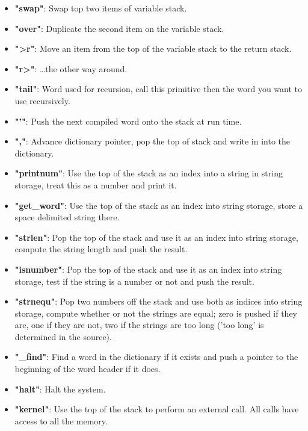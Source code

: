 \documentclass	[a4paper, 10pt]	{article}
\begin{document}
\begin{itemize}
        \item \textbf{"swap"}: Swap top two items of variable stack.
        \item \textbf{"over"}: Duplicate the second item on the variable stack. 
        \item \textbf{">r"}: Move an item from the top of the variable
        stack to the return stack.
        \item \textbf{"r>"}: \ldots the other way around.
        \item \textbf{"tail"}: Word used for recursion, call this primitive
        then the word you want to use recursively.
        \item \textbf{"'"}: Push the next compiled word onto the stack at
        run time.
        \item \textbf{","}: Advance dictionary pointer, pop the top of stack
        and write in into the dictionary.
        \item \textbf{"printnum"}: Use the top of the stack as an index into
        a string in string storage, treat this as a number and print it.
        \item \textbf{"get\_word"}: Use the top of the stack as an index into
        string storage, store a space delimited string there.
        \item \textbf{"strlen"}: Pop the top of the stack and use it as an index
        into string storage, compute the string length and push the result.
        \item \textbf{"isnumber"}: Pop the top of the stack and use it as an index
        into string storage, test if the string is a number or not and push the
        result.
        \item \textbf{"strnequ"}: Pop two numbers off the stack and use both
        as indices into string storage, compute whether or not the strings are
        equal; zero is pushed if they are, one if they are not, two if the strings
        are too long ('too long' is determined in the source).
        \item \textbf{"\_find"}: Find a word in the dictionary if it
        exists and push a pointer to the beginning of the word header if
        it does.
        \item \textbf{"halt"}: Halt the system.
        \item \textbf{"kernel"}: Use the top of the stack to perform an
        external call. All calls have access to all the memory.
      \end{itemize}
\end{document}
